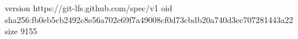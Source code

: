 version https://git-lfs.github.com/spec/v1
oid sha256:fb0eb5cb2492c8e56a702e69f7a49008cf0d73cbdb20a740d3ec707281443a22
size 9155
